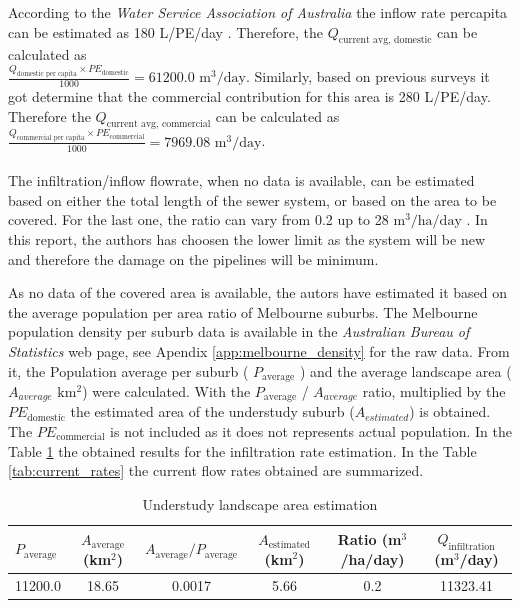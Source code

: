 \documentclass[12pt]{article}
\begin{document}
According to the \textit{Water Service Association of Australia} the inflow rate percapita
can be estimated as 
180
L/PE/day \cite{yarravalleywater_2023_amf}. Therefore, the 
\( Q_{\text{current avg, domestic}} \) can be calculated as\\
\(\frac{Q_{\text{domestic per capita}} \times PE_{\text{domestic}}}{1000}= 61200.0\)
\(\mathrm{m^3/day}\).
Similarly, based on previous surveys it got determine that the commercial contribution for this area is
280 L/PE/day. Therefore the 
\( Q_{\text{current avg, commercial}} \) can be calculated as
\(\frac{Q_{\text{commercial per capita}} \times PE_{\text{commercial}}}{1000}= 7969.08\)
\(\mathrm{m^3/day}\).\\
\\
The infiltration/inflow flowrate, when no data is available, can be estimated based on either the
total length of the sewer system, or based on the area to be covered. For the last one, the ratio can vary
from 0.2 up to 28 \(\mathrm{m^3/ha/day}\) \cite{metcalf_2014_wastewater}. In this report, the authors
has choosen the lower limit as the system will be new and therefore the damage on the pipelines will be
minimum. 

As no data of the covered area is available, the autors have estimated it based on the average
population per area ratio of Melbourne suburbs. The Melbourne population density per suburb data is available in the 
\textit{Australian Bureau of Statistics} web page, see Apendix  \ref{app:melbourne_density} for the raw data.
From it, the Population average per suburb ( \(P_{\text{average}}\) ) and the average landscape area (\(A_{average}\) \(\mathrm{km^2}\))
were calculated. With the \(P_{\text{average}}\) / \(A_{average}\) ratio, multiplied by the \(PE_{\mathrm{domestic}}\)
the estimated area of the understudy suburb (\(A_{estimated}\)) is obtained. The \(PE_{\mathrm{commercial}}\) is not included
as it does not represents actual population. In the Table \ref{tab:und_study_area} the obtained results for the infiltration 
rate estimation. In the Table \ref{tab:current_rates} the current flow rates obtained are summarized.\\

\begin{table}[h]
  \centering
  \caption{Understudy landscape area estimation}
  \label{tab:und_study_area}
  \begin{tabular}{|p{2cm}|c|c|c|c|c|}
  \hline
  $P_{\text{average}}$ & $A_{\text{average}}$ (km$^2$) & $A_{\text{average}} / P_{\text{average}}$ & $A_{\text{estimated}}$ (km$^2$) & Ratio (m$^3$/ha/day) & $Q_{\text{infiltration}}$ (m$^3$/day) \\
  \hline
  11200.0 & 18.65 & 0.0017 & 5.66 & 0.2 & 11323.41 \\
  \hline
  \end{tabular}
\end{table}
\end{document}

